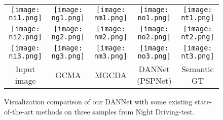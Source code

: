 \documentclass[final]{cvpr}
\begin{document}
\begin{figure*}[h]
	\begin{center}
		\begin{tabular}{ccccc}
			\hspace{-.26cm}
			\texttt{[image: ni1.png]} & \hspace{-.45cm}
			\texttt{[image: ng1.png]} & \hspace{-.45cm}
			\texttt{[image: nm1.png]} & \hspace{-.45cm}
			\texttt{[image: no1.png]} & \hspace{-.45cm}
			\texttt{[image: nt1.png]} \vspace{-.05cm} \\
			\hspace{-.26cm}
			\texttt{[image: ni2.png]} & \hspace{-.45cm}
			\texttt{[image: ng2.png]} & \hspace{-.45cm}
			\texttt{[image: nm2.png]} & \hspace{-.45cm}
			\texttt{[image: no2.png]} & \hspace{-.45cm}
			\texttt{[image: nt2.png]} \vspace{-.05cm} \\
			\hspace{-.26cm}
			\texttt{[image: ni3.png]} & \hspace{-.45cm}
			\texttt{[image: ng3.png]} & \hspace{-.45cm}
			\texttt{[image: nm3.png]} & \hspace{-.45cm}
			\texttt{[image: no3.png]} & \hspace{-.45cm}
			\texttt{[image: nt3.png]} \vspace{-.05cm} \\
			\hspace{-.26cm}
			Input image   & \hspace{-.45cm}  GCMA \cite{sakaridis2019guided}  & \hspace{-.45cm} MGCDA \cite{sakaridis2020map}  & \hspace{-.45cm} DANNet (PSPNet) & \hspace{-.45cm} Semantic GT \\
		\end{tabular}
		\vspace{2pt}
		\caption{Visualization comparison of our DANNet with some existing state-of-the-art methods on three samples from Night Driving-test.}
		\label{fig_comparison_nd}
	\end{center}
	\vspace{-7pt}
\end{figure*}
\end{document}
